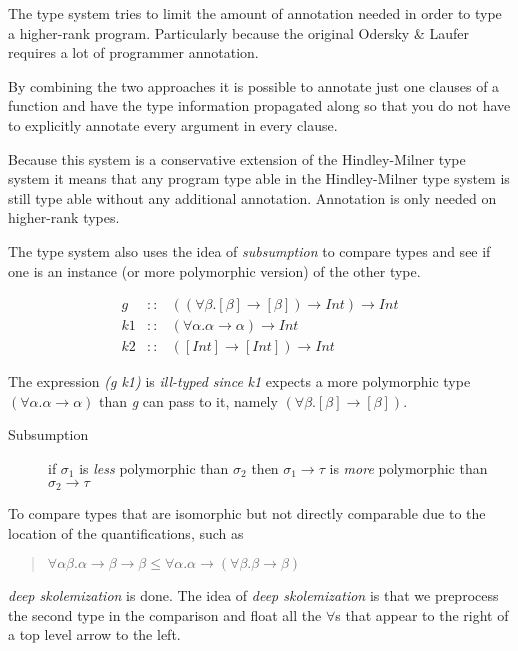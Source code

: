 The type system tries to limit the amount of annotation needed in order to type a higher-rank program. Particularly because the original Odersky \& Laufer\cite{odesky} requires a lot of programmer annotation.

By combining the two approaches it is possible to annotate just one clauses of a function and have the type information propagated along so that you do not have to explicitly annotate every argument in every clause.

Because this system is a conservative extension of the Hindley-Milner type system it means that any program type able in the Hindley-Milner type system is still type able without any additional annotation. Annotation is only needed on higher-rank types.

The type system also uses the idea of \textit{subsumption} to compare types and see if one is an instance (or more polymorphic version) of the other type. 

\begin{eqnarray*}
g  &::& ((\forall\beta.[\beta] \rightarrow [\beta]) \rightarrow Int) \rightarrow Int \\
k1 &::& (\forall\alpha. \alpha \rightarrow \alpha) \rightarrow Int\\
k2 &::& ([Int] \rightarrow [Int]) \rightarrow Int
\end{eqnarray*}

The expression \textit{(g k1)} is \textit{ill-typed since} \textit{k1} expects a more polymorphic type $(\forall\alpha. \alpha \rightarrow \alpha)$ than \emph{g} can pass to it, namely $(\forall\beta.[\beta] \rightarrow [\beta])$. 

\begin{description}
\item[Subsumption] if $\sigma_1$ is \textit{less} polymorphic than $\sigma_2$ then $\sigma_1 \rightarrow \tau$ is \textit{more} polymorphic than $\sigma_2 \rightarrow \tau$
\end{description}

To compare types that are isomorphic but not directly comparable due to the location of the quantifications, such as
\begin{quotation}
$\forall\alpha\beta.\alpha\rightarrow\beta\rightarrow\beta\leq\forall\alpha.\alpha\rightarrow(\forall\beta.\beta\rightarrow\beta)$
\end{quotation}

\textit{deep skolemization} is done. The idea of \textit{deep skolemization} is that we preprocess the second type in the comparison and float all the $\forall$s that appear to the right of a top level arrow to the left.

